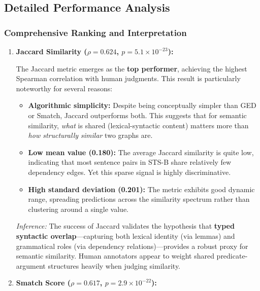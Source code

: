 \documentclass[11pt,a4paper]{article}
\begin{document}
\subsection{Detailed Performance Analysis}

\subsubsection{Comprehensive Ranking and Interpretation}

\begin{enumerate}
    \item \textbf{Jaccard Similarity ($\rho = 0.624$, $p = 5.1 \times 10^{-23}$):} 
    
    The Jaccard metric emerges as the \textbf{top performer}, achieving the highest Spearman correlation with human judgments. This result is particularly noteworthy for several reasons:
    \begin{itemize}
        \item \textbf{Algorithmic simplicity:} Despite being conceptually simpler than GED or Smatch, Jaccard outperforms both. This suggests that for semantic similarity, \textit{what} is shared (lexical-syntactic content) matters more than \textit{how structurally similar} two graphs are.
        \item \textbf{Low mean value (0.180):} The average Jaccard similarity is quite low, indicating that most sentence pairs in STS-B share relatively few dependency edges. Yet this sparse signal is highly discriminative.
        \item \textbf{High standard deviation (0.201):} The metric exhibits good dynamic range, spreading predictions across the similarity spectrum rather than clustering around a single value.
    \end{itemize}
    
    \textit{Inference:} The success of Jaccard validates the hypothesis that \textbf{typed syntactic overlap}---capturing both lexical identity (via lemmas) and grammatical roles (via dependency relations)---provides a robust proxy for semantic similarity. Human annotators appear to weight shared predicate-argument structures heavily when judging similarity.
    
    \item \textbf{Smatch Score ($\rho = 0.617$, $p = 2.9 \times 10^{-22}$):} 
    

\end{enumerate}
\end{document}
